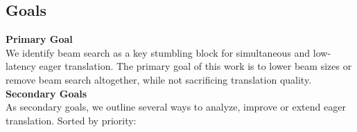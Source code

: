 \documentclass[english]{uzhpub}
\begin{document}



\subsection{Goals}

\textbf{Primary Goal} \\

\noindent We identify beam search as a key stumbling block for simultaneous and low-latency eager translation. The primary goal of this work is to lower beam sizes or remove beam search altogether, while not sacrificing translation quality. \\

\noindent \textbf{Secondary Goals} \\

\noindent As secondary goals, we outline several ways to analyze, improve or extend eager translation. Sorted by priority: \\
\end{document}
